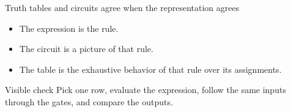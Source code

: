 \begin{frame}{Truth tables and circuits agree when the representation agrees}
\begin{itemize}
\item The expression is the rule.
\item The circuit is a picture of that rule.
\item The table is the exhaustive behavior of that rule over its assignments.
\end{itemize}
\begin{block}{Visible check}
Pick one row, evaluate the expression, follow the same inputs through the gates, and compare the outputs.
\end{block}
\end{frame}
